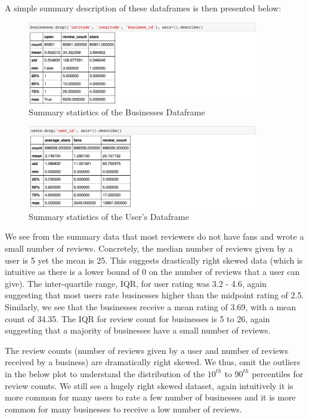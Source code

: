 \documentclass[11pt]{article}
\begin{document}
A simple summary description of these dataframes is then presented below:

\begin{figure}[H]
\centering
\includegraphics[width=0.9\textwidth]{./ac209/bizdescribe.png}
\caption{Summary statistics of the Businesses Dataframe}
\end{figure}

\begin{figure}[H]
\centering
\includegraphics[width=0.9\textwidth]{./ac209/userdescribe.png}
\caption{Summary statistics of the User's Dataframe}
\end{figure}

\par We see from the summary data that most reviewers do not have fans and wrote a small number of reviews. Concretely, the median number of reviews given by a user is 5 yet the mean is 25. This suggests drastically right skewed data (which is intuitive as there is a lower bound of 0 on the number of reviews that a user can give). The inter-quartile range, IQR, for user rating was 3.2 - 4.6, again suggesting that most users rate businesses higher than the midpoint rating of 2.5. Similarly, we see that the businesses receive a mean rating of 3.69, with a mean count of 34.35. The IQR for review count for businesses is 5 to 26, again suggesting that a majority of businesses have a small number of reviews. \\

\par The review counts (number of reviews given by a user and number of reviews received by a business) are dramatically right skewed. We thus, omit the outliers in the below plot to understand the distribution of the $10^{th}$ to $90^{th}$ percentiles for review counts. We still see a hugely right skewed dataset, again intuitively it is more common for many users to rate a few number of businesses and it is more common for many businesses to receive a low number of reviews.
\end{document}
